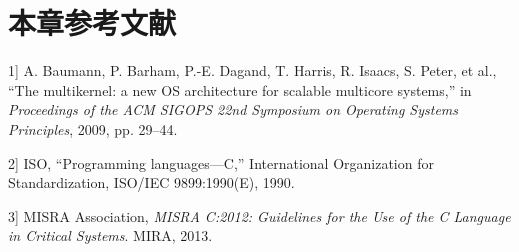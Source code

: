\section{本章参考文献}\label{sec:9-bibliography}

\protect{}\label{cite:9-1}

\noindent {[}1{]} A. Baumann, P. Barham, P.-E. Dagand, T. Harris, R. Isaacs, S. Peter, et al., ``The multikernel: a new OS architecture for scalable multicore systems,'' in \textit{Proceedings of the ACM SIGOPS 22nd Symposium on Operating Systems Principles}, 2009, pp. 29--44.

\protect{}\label{cite:9-2}

\noindent {[}2{]} ISO, ``Programming languages---C,'' International Organization for Standardization, ISO/IEC 9899:1990(E), 1990.

\protect{}\label{cite:9-3}

\noindent {[}3{]} MISRA Association, \textit{MISRA C:2012: Guidelines for the Use of the C Language in Critical Systems}. MIRA, 2013.

